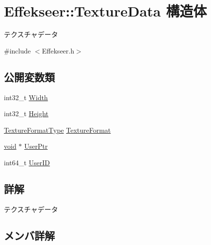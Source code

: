 \hypertarget{struct_effekseer_1_1_texture_data}{}\section{Effekseer\+:\+:Texture\+Data 構造体}
\label{struct_effekseer_1_1_texture_data}


テクスチャデータ  




{\ttfamily \#include $<$Effekseer.\+h$>$}

\subsection*{公開変数類}
\begin{DoxyCompactItemize}
\item 
int32\+\_\+t \mbox{\hyperlink{struct_effekseer_1_1_texture_data_ab1391055f7b4bf482c89469de1061e08}{Width}}
\item 
int32\+\_\+t \mbox{\hyperlink{struct_effekseer_1_1_texture_data_a0f166cd56ce89be41bba7609d612ee87}{Height}}
\item 
\mbox{\hyperlink{namespace_effekseer_ad44c2314bf2d674ae0e6d62db6ff4484}{Texture\+Format\+Type}} \mbox{\hyperlink{struct_effekseer_1_1_texture_data_a5ac6643229c4057700611562d3d5a1fb}{Texture\+Format}}
\item 
\mbox{\hyperlink{namespace_effekseer_ab34c4088e512200cf4c2716f168deb56}{void}} $\ast$ \mbox{\hyperlink{struct_effekseer_1_1_texture_data_aad80a00cb49b0822befc1dd213ee8b8b}{User\+Ptr}}
\item 
int64\+\_\+t \mbox{\hyperlink{struct_effekseer_1_1_texture_data_a5f513f3b26e5d1b6b3de376c7263ad66}{User\+ID}}
\end{DoxyCompactItemize}


\subsection{詳解}
テクスチャデータ 

\subsection{メンバ詳解}
\mbox{\label{struct_effekseer_1_1_texture_data_a0f166cd56ce89be41bba7609d612ee87}} 

